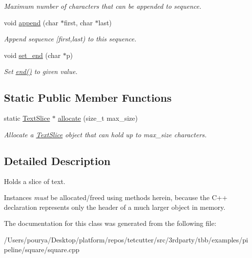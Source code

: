 \begin{DoxyCompactItemize}
\begin{DoxyCompactList}\small\item\em Maximum number of characters that can be appended to sequence. \end{DoxyCompactList}\item 
\hypertarget{classTextSlice_a62cc0c0f20f507a7b4eff6afaf709940}{}void \hyperlink{classTextSlice_a62cc0c0f20f507a7b4eff6afaf709940}{append} (char $\ast$first, char $\ast$last)\label{classTextSlice_a62cc0c0f20f507a7b4eff6afaf709940}

\begin{DoxyCompactList}\small\item\em Append sequence \mbox{[}first,last) to this sequence. \end{DoxyCompactList}\item 
\hypertarget{classTextSlice_a2a3245bb7df15fa73e7044a94f10bb97}{}void \hyperlink{classTextSlice_a2a3245bb7df15fa73e7044a94f10bb97}{set\+\_\+end} (char $\ast$p)\label{classTextSlice_a2a3245bb7df15fa73e7044a94f10bb97}

\begin{DoxyCompactList}\small\item\em Set \hyperlink{classTextSlice_a30714d1a25fdc3b1360592299ade57f2}{end()} to given value. \end{DoxyCompactList}\end{DoxyCompactItemize}
\subsection*{Static Public Member Functions}
\begin{DoxyCompactItemize}
\item 
\hypertarget{classTextSlice_a478341265b9b836672ecc22cfb76c42f}{}static \hyperlink{classTextSlice}{Text\+Slice} $\ast$ \hyperlink{classTextSlice_a478341265b9b836672ecc22cfb76c42f}{allocate} (size\+\_\+t max\+\_\+size)\label{classTextSlice_a478341265b9b836672ecc22cfb76c42f}

\begin{DoxyCompactList}\small\item\em Allocate a \hyperlink{classTextSlice}{Text\+Slice} object that can hold up to max\+\_\+size characters. \end{DoxyCompactList}\end{DoxyCompactItemize}


\subsection{Detailed Description}
Holds a slice of text. 

Instances {\itshape must} be allocated/freed using methods herein, because the C++ declaration represents only the header of a much larger object in memory. 

The documentation for this class was generated from the following file\+:\begin{DoxyCompactItemize}
\item 
/\+Users/pourya/\+Desktop/platform/repos/tetcutter/src/3rdparty/tbb/examples/pipeline/square/square.\+cpp\end{DoxyCompactItemize}
